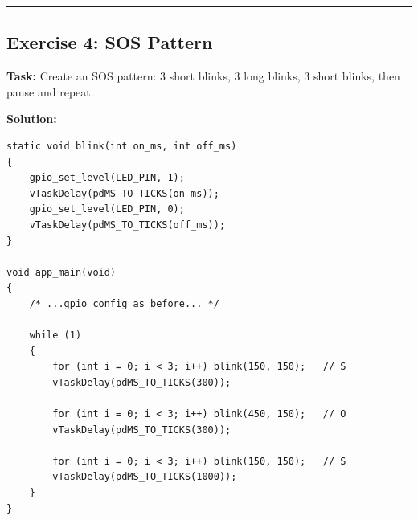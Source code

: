 \documentclass[11pt]{article}
\begin{document}
\bigskip
\noindent\rule{\textwidth}{0.4pt}
\bigskip

\subsection*{Exercise 4: SOS Pattern}
\textbf{Task:} Create an SOS pattern: 3 short blinks, 3 long blinks, 3 short blinks, then pause and repeat.

\textbf{Solution:}
\begin{verbatim}
static void blink(int on_ms, int off_ms)
{
    gpio_set_level(LED_PIN, 1);
    vTaskDelay(pdMS_TO_TICKS(on_ms));
    gpio_set_level(LED_PIN, 0);
    vTaskDelay(pdMS_TO_TICKS(off_ms));
}

void app_main(void)
{
    /* ...gpio_config as before... */

    while (1)
    {
        for (int i = 0; i < 3; i++) blink(150, 150);   // S
        vTaskDelay(pdMS_TO_TICKS(300));

        for (int i = 0; i < 3; i++) blink(450, 150);   // O
        vTaskDelay(pdMS_TO_TICKS(300));

        for (int i = 0; i < 3; i++) blink(150, 150);   // S
        vTaskDelay(pdMS_TO_TICKS(1000));
    }
}
\end{verbatim}
\end{document}
